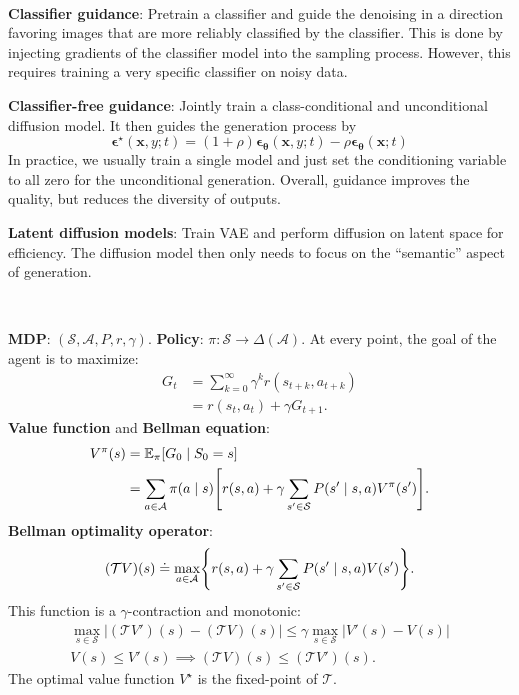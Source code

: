 \documentclass{article}
\newcommand{\lft}{\mathopen{}\mathclose\bgroup\left}
\newcommand{\rgt}{\aftergroup\egroup\right}
\newcommand{\E}{\mathbb{E}}
\renewcommand{\vec}[1]{\bm{#1}}
\newenvironment{topic}[1]
{\textbf{\sffamily \colorbox{black}{\rlap{\textbf{\textcolor{white}{#1}}}\hspace{\linewidth}\hspace{-2\fboxsep}}} \\ \vspace{0.2cm}}
{}
\begin{document}
\begin{multicols*}{2}
\begin{topic}{Diffusion models}
        \textbf{Classifier guidance}: Pretrain a classifier and guide the denoising in a direction
        favoring images that are more reliably classified by the classifier. This is done by
        injecting gradients of the classifier model into the sampling process. However, this requires
        training a very specific classifier on noisy data.

        \textbf{Classifier-free guidance}: Jointly train a class-conditional and unconditional diffusion model. It then guides the generation process by \[
            \vec{\epsilon}^\star(\vec{x}, y; t) = (1 + \rho) \vec{\epsilon}_{\vec{\theta}}(\vec{x}, y; t) - \rho \vec{\epsilon}_{\vec{\theta}}(\vec{x}; t)
        \]
        In practice, we usually train a single model and just set the conditioning variable to all zero for
        the unconditional generation. Overall, guidance improves the quality, but reduces the diversity of
        outputs.

        \textbf{Latent diffusion models}: Train VAE and perform diffusion on latent space for
        efficiency. The diffusion model then only needs to focus on the ``semantic'' aspect of
        generation.

    \end{topic}

    \begin{topic}{Reinforcement learning}

        \textbf{MDP}: $(\mathcal{S}, \mathcal{A}, P, r, \gamma)$. \textbf{Policy}: $\pi: \mathcal{S} \to
            \Delta(\mathcal{A})$. At every point, the goal of the agent is to maximize:
        \begin{align*}
            G_t & = \sum_{k=0}^{\infty} \gamma^k r(s_{t+k}, a_{t+k}) \\
                & = r(s_t, a_t) + \gamma G_{t+1}.
        \end{align*}
        \textbf{Value function} and \textbf{Bellman equation}:
        \begin{align*}
            V^\pi(s) & = \E_{\pi} [G_0 \mid S_0 = s]                                                                                             \\
                     & = \sum_{a \in \mathcal{A}} \pi(a \mid s) \lft[ r(s,a) + \gamma \sum_{s' \in \mathcal{S}} P(s' \mid s, a) V^\pi(s') \rgt].
        \end{align*}
        \textbf{Bellman optimality operator}: \[
            (\mathcal{T} V) (s) \doteq \max_{a \in \mathcal{A}} \lft\{ r(s,a) + \gamma \sum_{s' \in \mathcal{S}} P(s' \mid s, a) V(s') \rgt\}.
        \]
        This function is a $\gamma$-contraction and monotonic:
        \begin{gather*}
            \max_{s \in \mathcal{S}} |(\mathcal{T}V')(s) - (\mathcal{T}V)(s)| \leq \gamma \max_{s \in \mathcal{S}} |V'(s) - V(s)| \\
            V(s) \leq V'(s) \implies (\mathcal{T}V)(s) \leq (\mathcal{T}V')(s).
        \end{gather*}
        The optimal value function $V^\star$ is the fixed-point of $\mathcal{T}$.


\end{topic}
\end{multicols*}
\end{document}
